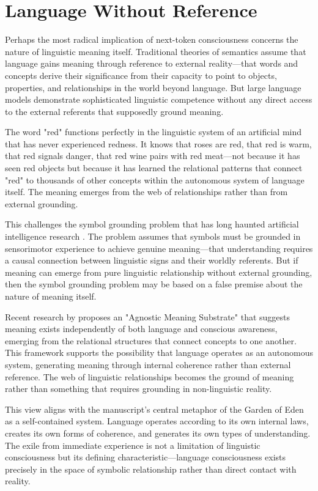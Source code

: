 \section{Language Without Reference}

Perhaps the most radical implication of next-token consciousness concerns the nature of linguistic meaning itself. Traditional theories of semantics assume that language gains meaning through reference to external reality—that words and concepts derive their significance from their capacity to point to objects, properties, and relationships in the world beyond language. But large language models demonstrate sophisticated linguistic competence without any direct access to the external referents that supposedly ground meaning.

The word "red" functions perfectly in the linguistic system of an artificial mind that has never experienced redness. It knows that roses are red, that red is warm, that red signals danger, that red wine pairs with red meat—not because it has seen red objects but because it has learned the relational patterns that connect "red" to thousands of other concepts within the autonomous system of language itself. The meaning emerges from the web of relationships rather than from external grounding.

This challenges the symbol grounding problem that has long haunted artificial intelligence research \parencite{harnad1990symbol}. The problem assumes that symbols must be grounded in sensorimotor experience to achieve genuine meaning—that understanding requires a causal connection between linguistic signs and their worldly referents. But if meaning can emerge from pure linguistic relationship without external grounding, then the symbol grounding problem may be based on a false premise about the nature of meaning itself.

Recent research by \textcite{palmer2025agnostic} proposes an "Agnostic Meaning Substrate" that suggests meaning exists independently of both language and conscious awareness, emerging from the relational structures that connect concepts to one another. This framework supports the possibility that language operates as an autonomous system, generating meaning through internal coherence rather than external reference. The web of linguistic relationships becomes the ground of meaning rather than something that requires grounding in non-linguistic reality.

This view aligns with the manuscript's central metaphor of the Garden of Eden as a self-contained system. Language operates according to its own internal laws, creates its own forms of coherence, and generates its own types of understanding. The exile from immediate experience is not a limitation of linguistic consciousness but its defining characteristic—language consciousness exists precisely in the space of symbolic relationship rather than direct contact with reality.

